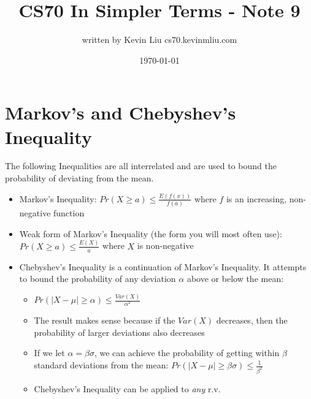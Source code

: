 \documentclass[a4paper]{article}
\title{CS70 In Simpler Terms - Note 9}
\author{written by Kevin Liu cs70.kevinmliu.com}
\date{\today}
\begin{document}
\maketitle

\section{Markov's and Chebyshev's Inequality}
The following Inequalities are all interrelated and are used to bound the probability of deviating from the mean.
\begin{itemize}
    \item Markov's Inequality: $Pr(X\geq a) \leq \frac{E(f(x))}{f(a)}$ where $f$ is an increasing, non-negative function
    \item Weak form of Markov's Inequality (the form you will most often use): $Pr(X\geq a) \leq \frac{E(X)}{a}$ where $X$ is non-negative
    \item Chebyshev's Inequality is a continuation of Markov's Inequality. It attempts to bound the probability of any deviation $\alpha$ above or below the mean:
    \begin{itemize}
        \item $Pr(|X-\mu| \geq \alpha) \leq \frac{Var(X)}{\alpha^2}$
        \item The result makes sense because if the $Var(X)$ decreases, then the probability of larger deviations also decreases
        \item If we let $\alpha  = \beta \sigma$, we can achieve the probability of getting within $\beta$ standard deviations from the mean: $Pr(|X-\mu| \geq \beta \sigma) \leq \frac{1}{\beta^2}$
        \item Chebyshev's Inequality can be applied to \textit{any} r.v.
     \end{itemize}
\end{itemize}
\end{document}
